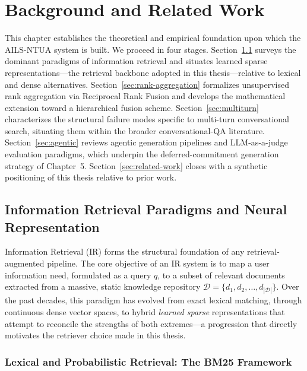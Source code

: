 \chapter{Background and Related Work}
\label{chapter:background}

This chapter establishes the theoretical and empirical foundation upon which the AILS-NTUA system is built. We proceed in four stages. Section~\ref{sec:ir-paradigms} surveys the dominant paradigms of information retrieval and situates learned sparse representations---the retrieval backbone adopted in this thesis---relative to lexical and dense alternatives. Section~\ref{sec:rank-aggregation} formalizes unsupervised rank aggregation via Reciprocal Rank Fusion and develops the mathematical extension toward a hierarchical fusion scheme. Section~\ref{sec:multiturn} characterizes the structural failure modes specific to multi-turn conversational search, situating them within the broader conversational-QA literature. Section~\ref{sec:agentic} reviews agentic generation pipelines and LLM-as-a-judge evaluation paradigms, which underpin the deferred-commitment generation strategy of Chapter~5. Section~\ref{sec:related-work} closes with a synthetic positioning of this thesis relative to prior work.

\section{Information Retrieval Paradigms and Neural Representation}
\label{sec:ir-paradigms}

Information Retrieval (IR) forms the structural foundation of any retrieval-augmented pipeline. The core objective of an IR system is to map a user information need, formulated as a query $q$, to a subset of relevant documents extracted from a massive, static knowledge repository $\mathcal{D} = \{d_1, d_2, \dots, d_{|\mathcal{D}|}\}$. Over the past decades, this paradigm has evolved from exact lexical matching, through continuous dense vector spaces, to hybrid \textit{learned sparse} representations that attempt to reconcile the strengths of both extremes---a progression that directly motivates the retriever choice made in this thesis.

\subsection{Lexical and Probabilistic Retrieval: The BM25 Framework}

